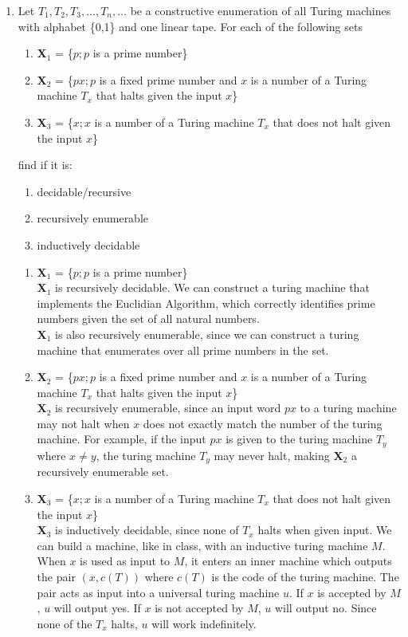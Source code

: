 \documentclass[10.5pt,letterpaper]{article}
\begin{document}
\begin{enumerate}[label=\textbf{Problem \arabic*.}]
\begin{enumerate}[label=\roman*)]
\item Let $T_1,T_2,T_3,\dots,T_n,\dots$ be a constructive enumeration of all Turing machines with alphabet \{0,1\} and one linear tape. For each of the following sets
	\begin{enumerate}[label=\roman*)]
		\item \textbf{X}$_1$ = \{$p;p$ is a prime number\}
		\item \textbf{X}$_2$ = \{$px;p$ is a fixed prime number and $x$ is a number of a Turing machine $T_x$ that halts given the input $x$\}
		\item \textbf{X}$_3$ = \{$x;x$ is a number of a Turing machine $T_x$ that does not halt given the input $x$\}
	\end{enumerate}
	find if it is:
	\begin{enumerate}[label=\alph*)]
		\item decidable/recursive
		\item recursively enumerable
		\item inductively decidable
	\end{enumerate}
	\begin{enumerate}[label=\roman*)]
		\item \textbf{X}$_1$ = \{$p;p$ is a prime number\}\\
			\textbf{X}$_1$ is recursively decidable. We can construct a turing machine that implements the Euclidian Algorithm, which correctly identifies prime numbers given the set of all natural numbers.\\
			\textbf{X}$_1$ is also recursively enumerable, since we can construct a turing machine that enumerates over all prime numbers in the set.
		\item \textbf{X}$_2$ = \{$px;p$ is a fixed prime number and $x$ is a number of a Turing machine $T_x$ that halts given the input $x$\}\\
			\textbf{X}$_2$ is recursively enumerable, since an input word $px$ to a turing machine may not halt when $x$ does not exactly match the number of the turing machine. For example, if the input $px$ is given to the turing machine $T_y$ where $x\neq y$, the turing machine $T_y$ may never halt, making \textbf{X}$_2$ a recursively enumerable set.
		\item \textbf{X}$_3$ = \{$x;x$ is a number of a Turing machine $T_x$ that does not halt given the input $x$\}\\
			\textbf{X}$_3$ is inductively decidable, since none of $T_x$ halts when given input. We can build a machine, like in class, with an inductive turing machine $M$. When $x$ is used as input to $M$, it enters an inner machine which outputs the pair $(x,c(T))$ where $c(T)$ is the code of the turing machine. The pair acts as input into a universal turing machine $u$. If $x$ is accepted by $M$, $u$ will output yes. If $x$ is not accepted by $M$, $u$ will output no. Since none of the $T_x$ halts, $u$ will work indefinitely.
	\end{enumerate}
\end{enumerate}
\end{enumerate}
\end{document}
